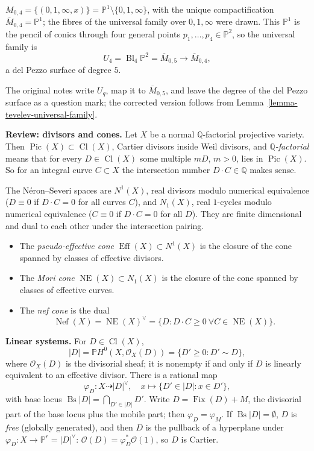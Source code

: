 \begin{example}
\label{example-tevelev-m04}
$M_{0,4}=\{(0,1,\infty,x)\}=
\mathbb{P}^1\setminus\{0,1,\infty\}$, with
the unique compactification
$\overline{M}_{0,4}=\mathbb{P}^1$; the
fibres of the universal family over
$0,1,\infty$ were drawn. This
$\mathbb{P}^1$ is the pencil of conics
through four general points
$p_1,\ldots,p_4\in\mathbb{P}^2$, so the
universal family is
$$
U_4=\operatorname{Bl}_4\mathbb{P}^2
=\overline{M}_{0,5}
\longrightarrow\overline{M}_{0,4},
$$
a del Pezzo surface of degree $5$.
\end{example}

The original notes write $U_q$, map it to
$\overline{M}_{0,5}$, and leave the degree
of the del Pezzo surface as a question mark;
the corrected version follows from
Lemma~\ref{lemma-tevelev-universal-family}.

\medskip\noindent
{\bf Review: divisors and cones.} Let $X$
be a normal $\mathbb{Q}$-factorial
projective variety. Then
$\operatorname{Pic}(X)\subset
\operatorname{Cl}(X)$, Cartier divisors
inside Weil divisors, and
\emph{$\mathbb{Q}$-factorial} means that for
every $D\in\operatorname{Cl}(X)$ some
multiple $mD$, $m>0$, lies in
$\operatorname{Pic}(X)$. So for an integral
curve $C\subset X$ the intersection number
$D\cdot C\in\mathbb{Q}$ makes sense.

The Néron--Severi spaces are
$N^1(X)$, real divisors modulo numerical
equivalence ($D\equiv 0$ if $D\cdot C=0$ for
all curves $C$), and $N_1(X)$, real
$1$-cycles modulo numerical equivalence
($C\equiv 0$ if $D\cdot C=0$ for all $D$).
They are finite dimensional and dual to each
other under the intersection pairing.
\begin{itemize}
\item The \emph{pseudo-effective cone}
$\operatorname{Eff}(X)\subset N^1(X)$ is the
closure of the cone spanned by classes of
effective divisors.
\item The \emph{Mori cone}
$\operatorname{NE}(X)\subset N_1(X)$ is the
closure of the cone spanned by classes of
effective curves.
\item The \emph{nef cone} is the dual
$$
\operatorname{Nef}(X)
=\operatorname{NE}(X)^\vee
=\{D : D\cdot C\geq 0
\ \forall C\in\operatorname{NE}(X)\}.
$$
\end{itemize}

\medskip\noindent
{\bf Linear systems.} For
$D\in\operatorname{Cl}(X)$,
$$
|D|=\mathbb{P}H^0(X,\mathcal{O}_X(D))
=\{D'\geq 0 : D'\sim D\},
$$
where $\mathcal{O}_X(D)$ is the divisorial
sheaf; it is nonempty if and only if $D$ is
linearly equivalent to an effective
divisor. There is a rational map
$$
\varphi_D\colon X\dashrightarrow |D|^\vee,
\quad
x\longmapsto\{D'\in|D| : x\in D'\},
$$
with base locus
$\operatorname{Bs}|D|=\bigcap_{D'\in|D|}D'$.
Write $D=\operatorname{Fix}(D)+M$, the
divisorial part of the base locus plus the
mobile part; then $\varphi_D=\varphi_M$. If
$\operatorname{Bs}|D|=\emptyset$, $D$ is
\emph{free} (globally generated), and then
$D$ is the pullback of a hyperplane under
$\varphi_D\colon X\to\mathbb{P}^r=|D|^\vee$:
$\mathcal{O}(D)=\varphi_D^*\mathcal{O}(1)$,
so $D$ is Cartier.

